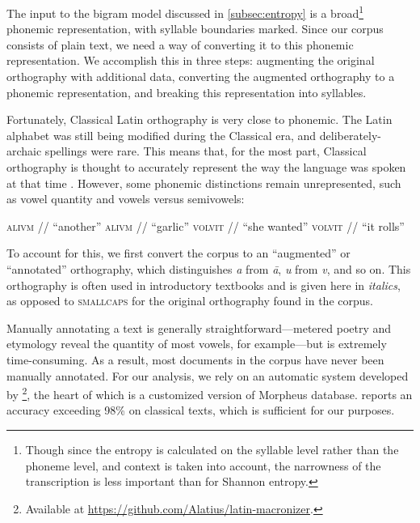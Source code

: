 \documentclass[12pt,twoside]{article}
\newcommand{\ipa}[1]{/\textipa{#1}/}
\begin{document}
The input to the bigram model discussed in \ref{subsec:entropy} is a broad\footnote{Though since the entropy is calculated on the syllable level rather than the phoneme level, and context is taken into account, the narrowness of the transcription is less important than for Shannon entropy.} phonemic representation, with syllable boundaries marked. Since our corpus consists of plain text, we need a way of converting it to this phonemic representation. We accomplish this in three steps: augmenting the original orthography with additional data, converting the augmented orthography to a phonemic representation, and breaking this representation into syllables.

Fortunately, Classical Latin orthography is very close to phonemic. The Latin alphabet was still being modified during the Classical era, and deliberately-archaic spellings were rare. This means that, for the most part, Classical orthography is thought to accurately represent the way the language was spoken at that time \citep[9]{allen}. However, some phonemic distinctions remain unrepresented, such as vowel quantity and vowels versus semivowels:

\begin{exe}
\ex \textsc{alivm} \ipa{a.li.um} ``another''
\ex \textsc{alivm} \ipa{a:.li.um} ``garlic''
\ex \textsc{volvit} \ipa{wo.lu.it} ``she wanted''
\ex \textsc{volvit} \ipa{wol.wit} ``it rolls''
\end{exe}

To account for this, we first convert the corpus to an ``augmented'' or ``annotated'' orthography, which distinguishes \emph{a} from \emph{\=a}, \emph{u} from \emph{v}, and so on. This orthography is often used in introductory textbooks and is given here in \emph{italics}, as opposed to \textsc{smallcaps} for the original orthography found in the corpus.

Manually annotating a text is generally straightforward---metered poetry and etymology reveal the quantity of most vowels, for example---but is extremely time-consuming. As a result, most documents in the corpus have never been manually annotated. For our analysis, we rely on an automatic system developed by \citet{winge}\footnote{Available at \url{https://github.com/Alatius/latin-macronizer}.}, the heart of which is a customized version of  Morpheus database. \citet[27]{winge} reports an accuracy exceeding 98\% on classical texts, which is sufficient for our purposes.

\end{document}
